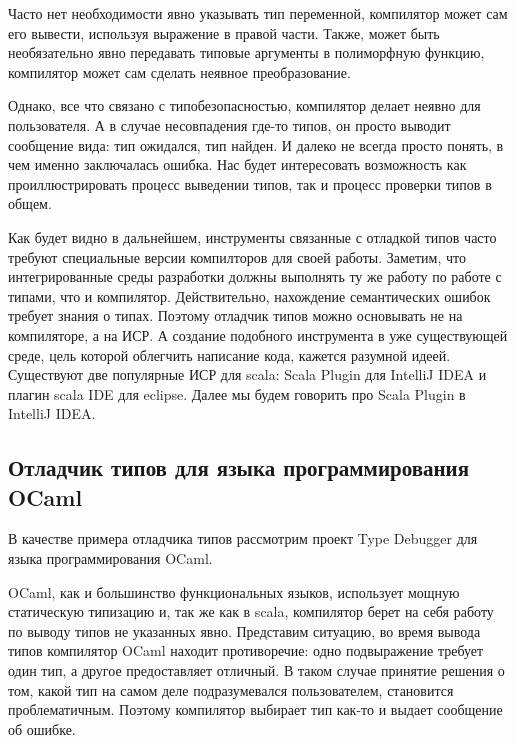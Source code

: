 Часто нет необходимости явно указывать тип переменной, компилятор может
сам его вывести, используя выражение в правой части.
Также, может быть необязательно явно передавать типовые аргументы в полиморфную
функцию, компилятор может сам сделать неявное преобразование.

Однако, все что связано с типобезопасностью, компилятор делает неявно для пользователя.
А в случае несовпадения где-то типов, он просто выводит сообщение вида:
тип ожидался, тип найден.
И далеко не всегда просто понять, в чем именно заключалась ошибка.
Нас будет интересовать возможность как проиллюстрировать процесс выведении типов,
так и процесс проверки типов в общем.



Как будет видно в дальнейшем, инструменты связанные с отладкой типов часто
требуют специальные версии компилторов для своей работы.
Заметим, что интегрированные среды разработки должны выполнять ту же работу по
работе с типами, что и компилятор.
Действительно, нахождение семантических ошибок требует знания о типах.
Поэтому отладчик типов можно основывать не на компиляторе, а на ИСР.
А создание подобного инструмента в уже существующей среде, цель которой
облегчить написание кода, кажется разумной идеей.
Существуют две популярные ИСР для scala: Scala Plugin для IntelliJ IDEA и
плагин scala IDE для eclipse.
Далее мы будем говорить про Scala Plugin в IntelliJ IDEA.

\subsection{Отладчик типов для языка программирования OCaml}
\label{sec:ocaml}
В качестве примера отладчика типов рассмотрим проект Type Debugger для
языка программирования OCaml.

OCaml, как и большинство функциональных языков, использует мощную статическую
типизацию и, так же как в scala, компилятор берет на себя работу по выводу типов
не указанных явно.
Представим ситуацию, во время вывода типов компилятор OCaml находит противоречие:
одно подвыражение требует один тип, а другое предоставляет отличный.
В таком случае принятие решения о том, какой тип на самом деле подразумевался
пользователем, становится проблематичным.
Поэтому компилятор выбирает тип как-то и выдает сообщение об ошибке.

